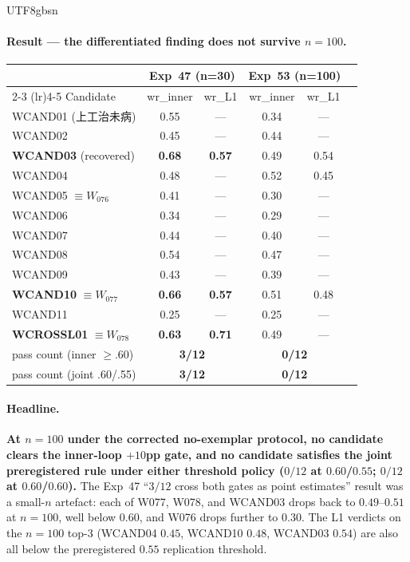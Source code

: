 \documentclass{article}
\begin{document}
\begin{CJK*}{UTF8}{gbsn}
\paragraph{Result --- the differentiated finding does not survive
\(n=100\).}

\begin{center}\small
\begin{tabular}{l c c c c c}
  \toprule
  & \multicolumn{2}{c}{Exp~47 (n=30)} & \multicolumn{2}{c}{Exp~53 (n=100)} \\
  \cmidrule(lr){2-3} \cmidrule(lr){4-5}
  Candidate & wr\_inner & wr\_L1 & wr\_inner & wr\_L1 \\
  \midrule
  WCAND01 (上工治未病)    & 0.55 & ---  & 0.34 & --- \\
  WCAND02                 & 0.45 & ---  & 0.44 & --- \\
  \textbf{WCAND03} (recovered) & \textbf{0.68} & \textbf{0.57} & 0.49 & 0.54 \\
  WCAND04                 & 0.48 & ---  & 0.52 & 0.45 \\
  WCAND05 \(\equiv W_{076}\) & 0.41 & --- & 0.30 & --- \\
  WCAND06                 & 0.34 & ---  & 0.29 & --- \\
  WCAND07                 & 0.44 & ---  & 0.40 & --- \\
  WCAND08                 & 0.54 & ---  & 0.47 & --- \\
  WCAND09                 & 0.43 & ---  & 0.39 & --- \\
  \textbf{WCAND10} \(\equiv W_{077}\) & \textbf{0.66} & \textbf{0.57} & 0.51 & 0.48 \\
  WCAND11                 & 0.25 & ---  & 0.25 & --- \\
  \textbf{WCROSSL01} \(\equiv W_{078}\) & \textbf{0.63} & \textbf{0.71} & 0.49 & --- \\
  \midrule
  pass count (inner \(\geq .60\)) & \multicolumn{2}{c}{\textbf{3/12}} & \multicolumn{2}{c}{\textbf{0/12}} \\
  pass count (joint .60/.55)  & \multicolumn{2}{c}{\textbf{3/12}} & \multicolumn{2}{c}{\textbf{0/12}} \\
  \bottomrule
\end{tabular}
\end{center}

\paragraph{Headline.}
\textbf{At \(n=100\) under the corrected no-exemplar protocol,
no candidate clears the inner-loop \(+10\)pp gate, and no
candidate satisfies the joint preregistered rule under either
threshold policy (\(0/12\) at \(0.60\)/\(0.55\); \(0/12\) at
\(0.60\)/\(0.60\)).} The Exp~47 ``\(3/12\) cross both gates as
point estimates'' result was a small-\(n\) artefact: each of
W077, W078, and WCAND03 drops back to \(0.49\)--\(0.51\) at
\(n=100\), well below \(0.60\), and W076 drops further to
\(0.30\). The L1 verdicts on the \(n=100\) top-3
(WCAND04 \(0.45\), WCAND10 \(0.48\), WCAND03 \(0.54\)) are also
all below the preregistered \(0.55\) replication threshold.


\end{CJK*}
\end{document}
